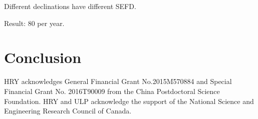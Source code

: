 \documentclass[]{raa}
\begin{document}
Different declinations have different SEFD.

Result: 80 per year.

\section{Conclusion}\label{sec.conclusion}

\begin{acknowledgements}
HRY acknowledges General Financial Grant No.2015M570884 and
Special Financial Grant No. 2016T90009 from the China
Postdoctoral Science Foundation.
HRY and ULP acknowledge the support of the
National Science and Engineering Research Council of Canada.
\end{acknowledgements}



\end{document}
